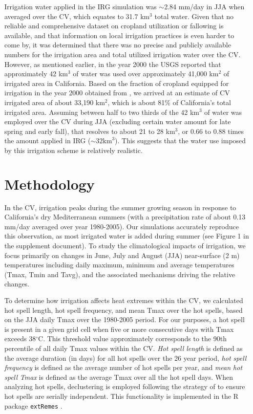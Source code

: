 Irrigation water applied in the IRG simulation was $\sim$2.84 mm/day in JJA when averaged over the CV, which equates to 31.7 km$^3$ total water. Given that no reliable and comprehensive dataset on cropland utilization or fallowing is available, and that information on local irrigation practices is even harder to come by, it was determined that there was no precise and publicly available numbers for the irrigation area and total utilized irrigation water over the CV. However, as mentioned earlier, in the year 2000 the USGS reported that approximately 42 km$^3$ of water was used over approximately 41,000 km$^2$ of irrigated area in California. Based on the fraction of cropland equipped for irrigation in the year 2000 obtained from \cite{siebert2005development}, we arrived at an estimate of CV irrigated area of about 33,190 km$^2$, which is about 81$\%$ of California's total irrigated area.  Assuming between half to two thirds of the 42 km$^3$ of water was employed over the CV during JJA (excluding certain water amount for late spring and early fall), that resolves to about 21 to 28 km$^3$, or 0.66 to 0.88 times the amount applied in IRG ($\sim32 \mbox{km}^3$). This suggests that the water use imposed by this irrigation scheme is relatively realistic.


\section{Methodology}

In the CV, irrigation peaks during the summer growing season \cite{salas2006estimating} in response to California's dry Mediterranean summers (with a precipitation rate of about 0.13 mm/day averaged over year 1980-2005). Our simulations accurately reproduce this observation, as most irrigated water is added during summer (see Figure 1 in the supplement document). To study the  climatological impacts of irrigation, we focus primarily on changes in June, July and August (JJA) near-surface (2 m) temperatures including daily maximum, minimum and average temperatures (Tmax, Tmin and Tavg), and the associated mechanisms driving the relative changes. 

To determine how irrigation affects heat extremes within the CV, we calculated hot spell length, hot spell frequency, and mean Tmax over the hot spells, based on the JJA daily Tmax over the 1980-2005 period. For our purposes, a hot spell is present in a given grid cell when five or more consecutive days with Tmax exceeds 38$^\circ$C. This threshold value approximately corresponds to the 90th percentile of all daily Tmax values within the CV. \textit{Hot spell length} is defined as the average duration (in days) for all  hot spells over the 26 year period, \textit{hot spell frequency} is defined as the average number of hot spells per year, and \textit{mean hot spell Tmax} is defined as the average Tmax over all the hot spell days. When analyzing hot spells, declustering is employed following the strategy of \cite{ferro2003inference} to ensure hot spells are serially independent.  This functionality is implemented in the R package \texttt{extRemes} \cite{gilleland2011new}.

